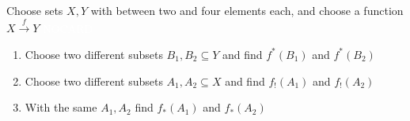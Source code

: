 

Choose sets $X,Y$ with between two and four elements each, and choose a function $X \xrightarrow{f} Y$  \textcolor{white}{NOCARD}
    \begin{enumerate}
      \item Choose two different subsets $B_1, B_2 \subseteq Y$ and find $f^*(B_1)$ and $f^*(B_2)$
      \item Choose two different subsets $A_1, A_2 \subseteq X$ and find $f_!(A_1)$ and $f_!(A_2)$
      \item With the same $A_1, A_2$ find $f_*(A_1)$ and $f_*(A_2)$
    \end{enumerate}